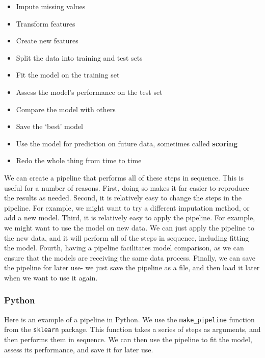 \documentclass[
  letterpaper,
]{krantz}
\providecommand{\tightlist}{%
  \setlength{\itemsep}{0pt}\setlength{\parskip}{0pt}}\usepackage{longtable,booktabs,array}
\begin{document}
\begin{itemize}
\tightlist
\item
  Impute missing values
\item
  Transform features
\item
  Create new features
\item
  Split the data into training and test sets
\item
  Fit the model on the training set
\item
  Assess the model's performance on the test set
\item
  Compare the model with others
\item
  Save the `best' model
\item
  Use the model for prediction on future data, sometimes called
  \textbf{scoring}
\item
  Redo the whole thing from time to time
\end{itemize}

We can create a pipeline that performs all of these steps in sequence.
This is useful for a number of reasons. First, doing so makes it far
easier to reproduce the results as needed. Second, it is relatively easy
to change the steps in the pipeline. For example, we might want to try a
different imputation method, or add a new model. Third, it is relatively
easy to apply the pipeline. For example, we might want to use the model
on new data. We can just apply the pipeline to the new data, and it will
perform all of the steps in sequence, including fitting the model.
Fourth, having a pipeline facilitates model comparison, as we can ensure
that the models are receiving the same data process. Finally, we can
save the pipeline for later use- we just save the pipeline as a file,
and then load it later when we want to use it again.

\subsubsection{Python}

Here is an example of a pipeline in Python. We use the
\texttt{make\_pipeline} function from the \texttt{sklearn} package. This
function takes a series of steps as arguments, and then performs them in
sequence. We can then use the pipeline to fit the model, assess its
performance, and save it for later use.
\end{document}
